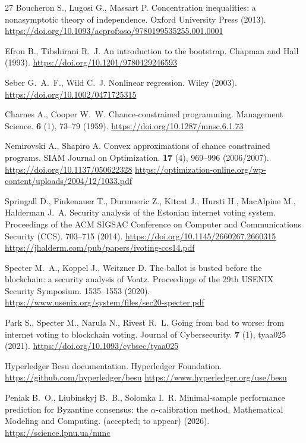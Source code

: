 \begin{thebibliography}{27}
Boucheron S., Lugosi G., Massart P. Concentration inequalities: a nonasymptotic
theory of independence. Oxford University Press (2013).
\url{https://doi.org/10.1093/acprof:oso/9780199535255.001.0001}

Efron B., Tibshirani R.~J. An introduction to the bootstrap. Chapman and Hall
(1993).
\url{https://doi.org/10.1201/9780429246593}

Seber G.~A.~F., Wild C.~J. Nonlinear regression. Wiley (2003).
\url{https://doi.org/10.1002/0471725315}

Charnes A., Cooper W.~W. Chance-constrained programming. Management Science.
\textbf{6} (1), 73--79 (1959).
\url{https://doi.org/10.1287/mnsc.6.1.73}

Nemirovski A., Shapiro A. Convex approximations of chance constrained programs.
SIAM Journal on Optimization. \textbf{17} (4), 969--996 (2006/2007).
\url{https://doi.org/10.1137/050622328}
\url{https://optimization-online.org/wp-content/uploads/2004/12/1033.pdf}

Springall D., Finkenauer T., Durumeric Z., Kitcat J., Hursti H., MacAlpine M.,
Halderman J.~A. Security analysis of the Estonian internet voting system.
Proceedings of the ACM SIGSAC Conference on Computer and Communications Security
(CCS). 703--715 (2014).
\url{https://doi.org/10.1145/2660267.2660315}
\url{https://jhalderm.com/pub/papers/ivoting-ccs14.pdf}

Specter M.~A., Koppel J., Weitzner D. The ballot is busted before the
blockchain: a security analysis of Voatz. Proceedings of the 29th USENIX
Security Symposium. 1535--1553 (2020).
\url{https://www.usenix.org/system/files/sec20-specter.pdf}

Park S., Specter M., Narula N., Rivest R.~L. Going from bad to worse: from
internet voting to blockchain voting. Journal of Cybersecurity. \textbf{7} (1),
tyaa025 (2021).
\url{https://doi.org/10.1093/cybsec/tyaa025}

Hyperledger Besu documentation. Hyperledger Foundation.
\url{https://github.com/hyperledger/besu}
\url{https://www.hyperledger.org/use/besu}

Peniak B.~O., Liubinskyj B.~B., Solomka I.~R. Minimal-sample performance
prediction for Byzantine consensus: the $\alpha$-calibration method.
Mathematical Modeling and Computing. (accepted; to appear) (2026).
\url{https://science.lpnu.ua/mmc}


\end{thebibliography}
